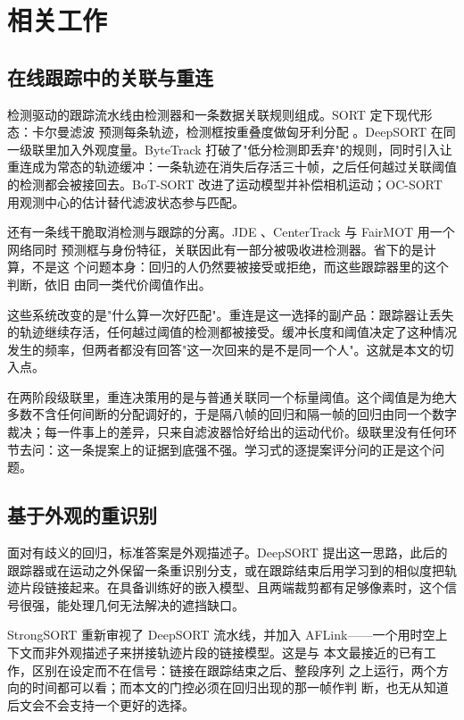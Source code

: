 \section{相关工作}

\subsection{在线跟踪中的关联与重连}

检测驱动的跟踪流水线由检测器和一条数据关联规则组成。SORT \cite{bewley2016sort} 定下现代形态：卡尔曼滤波 \cite{kalman1960} 预测每条轨迹，检测框按重叠度做匈牙利分配 \cite{kuhn1955}。DeepSORT \cite{wojke2017deepsort} 在同一级联里加入外观度量。ByteTrack \cite{zhang2022bytetrack} 打破了"低分检测即丢弃"的规则，同时引入让重连成为常态的轨迹缓冲：一条轨迹在消失后存活三十帧，之后任何越过关联阈值的检测都会被接回去。BoT-SORT \cite{aharon2022botsort} 改进了运动模型并补偿相机运动；OC-SORT \cite{cao2023ocsort} 用观测中心的估计替代滤波状态参与匹配。

还有一条线干脆取消检测与跟踪的分离。JDE \cite{wang2020jde}、CenterTrack
\cite{zhou2020centertrack} 与 FairMOT \cite{zhang2021fairmot} 用一个网络同时
预测框与身份特征，关联因此有一部分被吸收进检测器。省下的是计算，不是这
个问题本身：回归的人仍然要被接受或拒绝，而这些跟踪器里的这个判断，依旧
由同一类代价阈值作出。

这些系统改变的是"什么算一次好匹配"。重连是这一选择的副产品：跟踪器让丢失的轨迹继续存活，任何越过阈值的检测都被接受。缓冲长度和阈值决定了这种情况发生的频率，但两者都没有回答"这一次回来的是不是同一个人"。这就是本文的切入点。

在两阶段级联里，重连决策用的是与普通关联同一个标量阈值。这个阈值是为绝大多数不含任何间断的分配调好的，于是隔八帧的回归和隔一帧的回归由同一个数字裁决；每一件事上的差异，只来自滤波器恰好给出的运动代价。级联里没有任何环节去问：这一条提案上的证据到底强不强。学习式的逐提案评分问的正是这个问题。

\subsection{基于外观的重识别}

面对有歧义的回归，标准答案是外观描述子。DeepSORT \cite{wojke2017deepsort} 提出这一思路，此后的跟踪器或在运动之外保留一条重识别分支，或在跟踪结束后用学习到的相似度把轨迹片段链接起来。在具备训练好的嵌入模型、且两端裁剪都有足够像素时，这个信号很强，能处理几何无法解决的遮挡缺口。

StrongSORT \cite{du2023strongsort} 重新审视了 DeepSORT 流水线，并加入
AFLink——一个用时空上下文而非外观描述子来拼接轨迹片段的链接模型。这是与
本文最接近的已有工作，区别在设定而不在信号：链接在跟踪结束之后、整段序列
之上运行，两个方向的时间都可以看；而本文的门控必须在回归出现的那一帧作判
断，也无从知道后文会不会支持一个更好的选择。

